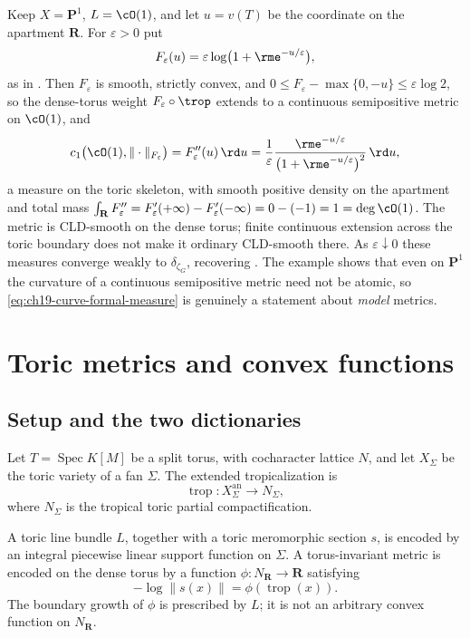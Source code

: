 \begin{example}
\label{ex:ch19-p1-nonpl}
Keep $X=\mathbf P^1$, $L=\cO(1)$, and let $u=v(T)$ be the coordinate on
the apartment $\mathbf R$.  For $\varepsilon>0$ put
\[
 F_\varepsilon(u)=\varepsilon\log\bigl(1+\rme^{-u/\varepsilon}\bigr),
\]
as in .  Then $F_\varepsilon$ is smooth, strictly
convex, and $0\leq F_\varepsilon-\max\{0,-u\}\leq\varepsilon\log2$, so
the dense-torus weight $F_\varepsilon\circ\trop$ extends to a continuous
semipositive metric on $\cO(1)$, and
\[
 c_1\bigl(\cO(1),\|\cdot\|_{F_\varepsilon}\bigr)
 =F_\varepsilon''(u)\,\rd u
 =\frac{1}{\varepsilon}
   \frac{\rme^{-u/\varepsilon}}{\bigl(1+\rme^{-u/\varepsilon}\bigr)^2}\,\rd u,
\]
a measure on the toric skeleton, with smooth positive density on the
apartment and total mass
$\int_{\mathbf R}F_\varepsilon''=F_\varepsilon'(+\infty)-F_\varepsilon'(-\infty)
=0-(-1)=1=\deg\cO(1)$.  The metric is CLD-smooth on the dense torus;
finite continuous extension across the toric boundary does not make it
ordinary CLD-smooth there.  As $\varepsilon\downarrow0$ these measures
converge weakly to $\delta_{\zeta_G}$, recovering
.  The example shows that even on
$\mathbf P^1$ the curvature of a continuous semipositive metric need not
be atomic, so \eqref{eq:ch19-curve-formal-measure} is genuinely a statement
about \emph{model} metrics.
\end{example}

\section{Toric metrics and convex functions}
\label{sec:ch19-toric}

\subsection{Setup and the two dictionaries}
\label{sec:ch19-toric-setup}

Let $T=\operatorname{Spec}K[M]$ be a split torus, with cocharacter lattice
$N$, and let $X_\Sigma$ be the toric variety of a fan $\Sigma$.  The
extended tropicalization is
\[
                  \operatorname{trop}:X_\Sigma^{\mathrm{an}}\longrightarrow N_\Sigma,
\]
where $N_\Sigma$ is the tropical toric partial compactification.

A toric line bundle $L$, together with a toric meromorphic section $s$,
is encoded by an integral piecewise linear support function on $\Sigma$.
A torus-invariant metric is encoded on the dense torus by a function
$\phi:N_{\mathbf R}\to\mathbf R$ satisfying
\begin{equation}
                       -\log\|s(x)\|=\phi(\operatorname{trop}(x)).
\label{eq:toric-metric-potential}
\end{equation}
The boundary growth of $\phi$ is prescribed by $L$; it is not an
arbitrary convex function on $N_{\mathbf R}$.

